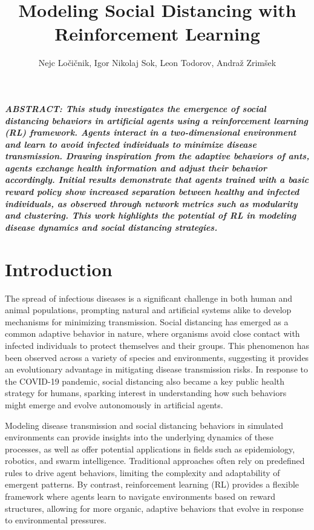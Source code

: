 \documentclass[9pt]{IEEEtran}
\title{\vspace{0ex}
Modeling Social Distancing with Reinforcement Learning}
\author{Nejc Ločičnik, Igor Nikolaj Sok, Leon Todorov, Andraž Zrimšek \vspace{-4.0ex}}
\begin{document}
\maketitle

\noindent\textit{\textbf{ABSTRACT: This study investigates the emergence of social distancing behaviors in artificial agents using a reinforcement learning (RL) framework. Agents interact in a two-dimensional environment and learn to avoid infected individuals to minimize disease transmission. Drawing inspiration from the adaptive behaviors of ants, agents exchange health information and adjust their behavior accordingly. Initial results demonstrate that agents trained with a basic reward policy show increased separation between healthy and infected individuals, as observed through network metrics such as modularity and clustering. This work highlights the potential of RL in modeling disease dynamics and social distancing strategies.}}

\section{Introduction}

The spread of infectious diseases is a significant challenge in both human and animal populations, prompting natural and artificial systems alike to develop mechanisms for minimizing transmission. Social distancing has emerged as a common adaptive behavior in nature, where organisms avoid close contact with infected individuals to protect themselves and their groups. This phenomenon has been observed across a variety of species and environments, suggesting it provides an evolutionary advantage in mitigating disease transmission risks. In response to the COVID-19 pandemic, social distancing also became a key public health strategy for humans, sparking interest in understanding how such behaviors might emerge and evolve autonomously in artificial agents.

Modeling disease transmission and social distancing behaviors in simulated environments can provide insights into the underlying dynamics of these processes, as well as offer potential applications in fields such as epidemiology, robotics, and swarm intelligence. Traditional approaches often rely on predefined rules to drive agent behaviors, limiting the complexity and adaptability of emergent patterns. By contrast, reinforcement learning (RL) provides a flexible framework where agents learn to navigate environments based on reward structures, allowing for more organic, adaptive behaviors that evolve in response to environmental pressures.
\end{document}

